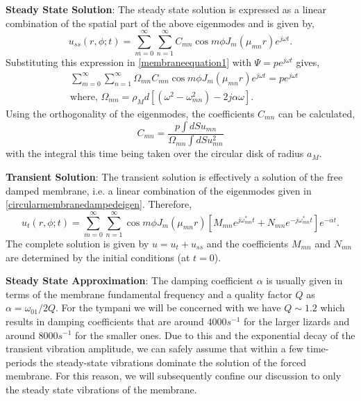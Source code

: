 \noindent\textbf{Steady State Solution}: The steady state solution is expressed as a linear combination of the spatial part
of the above eigenmodes and is given by,
\begin{equation}\label{membraness1}
 u_{ss}(r,\phi ;t)=\displaystyle\sum^\infty_{m=0}\sum^\infty_{n=1} C_{mn}\cos m\phi J_m(\mu_{mn} r)e^{j\omega t}.
\end{equation}
Substituting this expression in \eqref{membraneequation1} with $\Psi=pe^{j\omega t}$ gives,
\begin{align}
 &\displaystyle\sum^\infty_{m=0}\sum^\infty_{n=1} \Omega_{mn}C_{mn}\cos m\phi J_m(\mu_{mn} r)e^{j\omega t}=pe^{j\omega t}\label{membraness2}\\
 &\text{where,  }\Omega_{mn}=\rho_M d \left[(\omega^2-\omega^2_{mn})-2j\alpha\omega\right]\label{omegafirstdef}.
\end{align}
Using the orthogonality of the eigenmodes, the coefficients $C_{mn}$ can be calculated,
\begin{equation}\label{sscoeffs}
 C_{mn}=\frac{p\int dS u_{mn}}{\Omega_{mn}\int dS u^2_{mn}}
\end{equation}
with the integral this time being taken over the circular disk of radius $a_M$.

\vspace{\baselineskip}
\noindent\textbf{Transient Solution}: The transient solution is effectively a solution of the free damped membrane, i.e. a linear 
combination of the eigenmodes given in \eqref{circularmembranedampedeigen}. Therefore,
\begin{equation}\label{membranet1}
 u_t(r,\phi;t)=\displaystyle\sum^\infty_{m=0}\sum^\infty_{n=1}\cos m\phi J_m(\mu_{mn} r)\left[M_{mn}e^{j\omega_{mn}^* t}+N_{mn}e^{-j\omega_{mn}^* t}\right]e^{-\alpha t}.
\end{equation}
The complete solution is given by $u=u_t+u_{ss}$ and the coefficients $M_{mn}$ and $N_{mn}$ are determined by the initial conditions (at $t=0$).

\vspace{\baselineskip}
\textbf{Steady State Approximation}: The damping coefficient $\alpha$ is usually given in terms of the membrane fundamental frequency and a quality factor $Q$ as $\alpha=\omega_{01}/2Q$. For the tympani
we will be concerned with we have $Q\sim 1.2$ which results in damping coefficients that are around $4000s^{-1} $ for the larger lizards and around $8000s^{-1}$ for the smaller ones. 
Due to this and the exponential decay of the transient vibration amplitude, we can safely assume that within a few time-periods the steady-state vibrations dominate the solution of the
forced membrane. For this reason, we will subsequently confine our discussion to only the steady state vibrations of the membrane.
